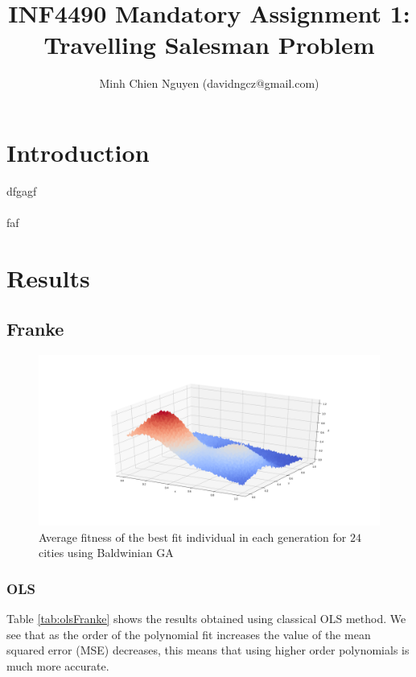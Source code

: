 \documentclass [11pt]{article}
\title{INF4490 Mandatory Assignment 1: \\ Travelling Salesman Problem}
\author{Minh Chien Nguyen (davidngcz@gmail.com)}
\begin{document}
\maketitle
\nocite{*}

\section{Introduction}
dfgagf\\
\\
faf
\section{Results}

\subsection{Franke}
\begin{figure}[H]
\centering
\includegraphics[width=1\textwidth]{figures/Franke.png}
        \caption{Average fitness of the best fit individual in each generation for $24$ cities using Baldwinian GA}
        \label{fig:Franke}
\end{figure}

\subsubsection{OLS}
Table \ref{tab:olsFranke} shows the results obtained using classical OLS method. We see that as the order of the polynomial fit increases the value of  the mean squared error (MSE) decreases, this means that using higher order polynomials is much more accurate. 
\end{document}

